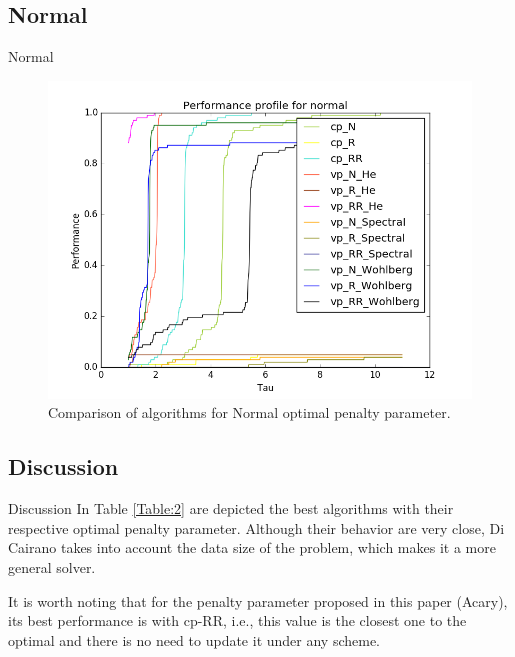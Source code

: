 \documentclass[8pt,red]{beamer}
\theoremstyle{plain}
\theoremstyle{definition}
\theoremstyle{remark}
\begin{document}
\subsection{Normal}
\begin{frame}{Normal}
\begin{figure}[hbtp]
\centering
\includegraphics[scale=0.4]{Results/Normal_mini.png}
\caption{Comparison of algorithms for Normal optimal penalty parameter.}
\end{figure}
\end{frame}

\subsection{Discussion}
\begin{frame}{Discussion}
In Table \ref{Table:2} are depicted the best algorithms with their respective optimal penalty parameter. Although their behavior are very close, Di Cairano takes into account the data size of the problem, which makes it a more general solver.

\begin{table}[h!]
\caption{Comparison of best algorithms.}
\label{Table:2}
\end{table}


It is worth noting that for the penalty parameter proposed in this paper (Acary), its best performance is with cp-RR, i.e., this value is the closest one to the optimal and there is no need to update it under any scheme.
\end{frame}
\end{document}

